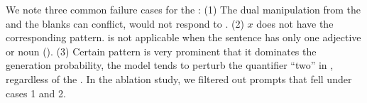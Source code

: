 We note three common failure cases for the \tagstrshorts:
(1) The dual manipulation from the \tagstrs and the blanks can conflict, \eg {} would not respond to .
(2) $x$ does not have the corresponding pattern.  is not applicable when the sentence has only one adjective or noun (\eg {}).
(3) Certain pattern is very prominent that it dominates the generation probability, \eg the model tends to perturb the quantifier ``two'' in , regardless of the \tagstrshort.
In the ablation study, we filtered out prompts that fell under cases 1 and 2.





